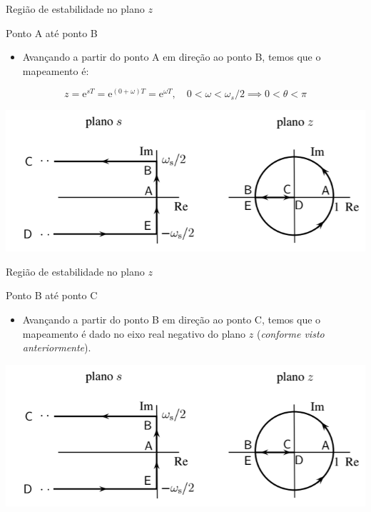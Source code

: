 \begin{frame}{Região de estabilidade no plano $z$}
\begin{block}{Ponto A até ponto B}
\begin{itemize}
	\item Avançando a partir do ponto A em direção ao ponto B, temos que o mapeamento é:
\end{itemize}
$$z = \text{e}^{sT} = \text{e}^{(0+\omega)T} = \text{e}^{\omega T}, \quad 0 < \omega < \omega_s/2 \implies 0 < \theta < \pi$$
\end{block}
\centerline{\includegraphics[width=0.9\linewidth]{Figuras/Ch05/fig3.PNG}}
\end{frame}

\begin{frame}{Região de estabilidade no plano $z$}
\begin{block}{Ponto B até ponto C}
\begin{itemize}
	\item Avançando a partir do ponto B em direção ao ponto C, temos que o mapeamento é dado no eixo real negativo do plano $z$ (\textit{conforme visto anteriormente}).
\end{itemize}
\end{block}
\centerline{\includegraphics[width=0.9\linewidth]{Figuras/Ch05/fig3.PNG}}
\end{frame}

